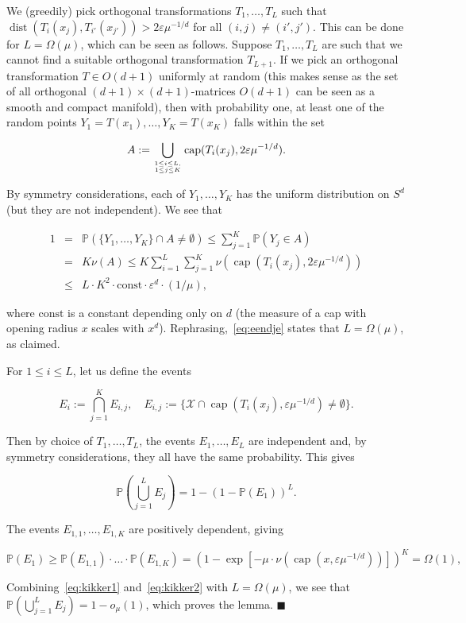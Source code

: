 \documentclass[11pt]{article}%
\newenvironment{proof}{\vspace{1ex}\noindent{\bf Proof.}}{\hspace*{\fill}$\blacksquare$\vspace{1ex}}
\newcommand{\Xcal}[0]{\ensuremath{{\mathcal X}}}
\newcommand{\Pee}[0]{\ensuremath{{\mathbb P}}}
\newcommand{\eps}{\varepsilon}
\DeclareMathOperator{\dist}{dist}
\DeclareMathOperator{\kap}{cap}
\begin{document}
\begin{proof}
We (greedily) pick orthogonal transformations $T_1,\dots,T_L$ such that 
$\dist\left(T_i(x_j),T_{i'}(x_{j'})\right) > 2 \eps \mu^{-1/d}$ for all
$(i,j)\neq(i',j')$.
This can be done for $L = \Omega( \mu )$, which can be seen as follows.
Suppose $T_1,\dots,T_L$ are such that we cannot find a suitable orthogonal transformation $T_{L+1}$.
If we pick an orthogonal transformation $T \in O(d+1)$ uniformly at random (this makes sense 
as the set of all orthogonal $(d+1)\times(d+1)$-matrices $O(d+1)$ can be seen as a smooth and compact manifold), then 
with probability one, at least one of the random points $Y_1 = T(x_1),\dots,Y_K = T(x_K)$ falls within 
the set  

$$ A := \bigcup_{1\leq i \leq L, \atop 1\leq j\leq K} \kap( T_i(x_j), 2\eps\mu^{-1/d} ). $$

By symmetry considerations, each of $Y_1,\dots,Y_K$ has the uniform distribution on $S^d$ (but they are not independent).
We see that 

\begin{equation}\label{eq:eendje} 
\begin{array}{rcl} 
1 
& = & \Pee( \{Y_1,\dots,Y_K\} \cap A \neq \emptyset )
\leq \sum_{j=1}^K \Pee( Y_j \in A ) \\
& = & K \nu(A) \leq K \sum_{i=1}^L \sum_{j=1}^K \nu( \kap( T_i(x_j), 2 \eps \mu^{-1/d} ) ) \\
& \leq & L \cdot K^2 \cdot \text{const} \cdot \eps^d \cdot (1/\mu), 
\end{array}
\end{equation}

\noindent
where $\text{const}$ is a constant depending only on $d$ (the measure of a cap with opening radius $x$ scales
with $x^d$).
Rephrasing,~\eqref{eq:eendje} states that $L = \Omega(\mu)$, as claimed.

For $1\leq i \leq L$, let us define the events

$$
E_i := \bigcap_{j=1}^K E_{i,j}, \quad 
E_{i,j} :=  \{ \Xcal \cap \kap(T_i(x_j),\eps\mu^{-1/d}) \neq \emptyset \}. $$

Then by choice of $T_1,\dots, T_L$, the events $E_1,\dots,E_L$ are independent and, 
by symmetry considerations, they all have the same probability.
This gives

\begin{equation}\label{eq:kikker1} 
\Pee\left( \bigcup_{j=1}^L E_j \right) = 1 - \left(1 - \Pee(E_1)\right)^L.  
\end{equation}

\noindent
The events $E_{1,1},\dots,E_{1,K}$ are positively dependent, giving

\begin{equation}\label{eq:kikker2} 
\Pee( E_1 ) \geq \Pee(E_{1,1})\cdot\dots\cdot\Pee(E_{1,K}) =
\left(1 - \exp[ - \mu \cdot \nu( \kap(x,\eps\mu^{-1/d})) ] \right)^K = \Omega(1), 
\end{equation}

\noindent
Combining~\eqref{eq:kikker1} and~\eqref{eq:kikker2} with $L = \Omega(\mu)$, we see that 
$\Pee\left( \bigcup_{j=1}^L E_j \right) = 1 - o_\mu(1)$, which proves the lemma.
\end{proof}
\end{document}
